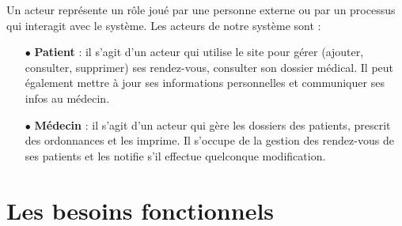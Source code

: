 \documentclass[a4paper]{report}
\begin{document}
Un acteur représente un rôle joué par une personne externe ou par un processus qui interagit avec le système.
\newline\newline
Les acteurs de notre système sont :
\newline
\begin{itemize}
    \item[$\bullet$] \textbf{Patient} : il s’agit d’un acteur qui utilise le site pour gérer 
    (ajouter, consulter, supprimer) ses rendez-vous, consulter son dossier médical. 
    Il peut également mettre à jour ses informations personnelles et communiquer ses infos au médecin.
    \item[$\bullet$] \textbf{Médecin} : il s’agit d’un acteur qui gère les dossiers des patients, prescrit des ordonnances et 
    les imprime. Il s’occupe de la gestion des rendez-vous de ses patients et les notifie s’il effectue 
    quelconque modification.
  \end{itemize}
  
\section{Les besoins fonctionnels}
\end{document}

